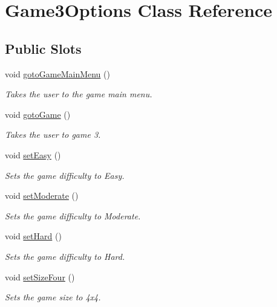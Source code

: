\hypertarget{classGame3Options}{\section{\-Game3\-Options \-Class \-Reference}
\label{classGame3Options}
}
\subsection*{\-Public \-Slots}
\begin{DoxyCompactItemize}
\item 
void \hyperlink{classGame3Options_a818c70fc684c9b850b6f7e5aa2caa8ce}{goto\-Game\-Main\-Menu} ()
\begin{DoxyCompactList}\small\item\em \-Takes the user to the game main menu. \end{DoxyCompactList}\item 
void \hyperlink{classGame3Options_a118d1afac58ddca1206ec61ea682a3ec}{goto\-Game} ()
\begin{DoxyCompactList}\small\item\em \-Takes the user to game 3. \end{DoxyCompactList}\item 
void \hyperlink{classGame3Options_a58fc11a12194fd807c6df76afd8ca0ff}{set\-Easy} ()
\begin{DoxyCompactList}\small\item\em \-Sets the game difficulty to \-Easy. \end{DoxyCompactList}\item 
void \hyperlink{classGame3Options_a9b419556514e2b5aa5a3264eff4eed23}{set\-Moderate} ()
\begin{DoxyCompactList}\small\item\em \-Sets the game difficulty to \-Moderate. \end{DoxyCompactList}\item 
void \hyperlink{classGame3Options_a0aa87fb6bd6c641e7612e864e20c4646}{set\-Hard} ()
\begin{DoxyCompactList}\small\item\em \-Sets the game difficulty to \-Hard. \end{DoxyCompactList}\item 
void \hyperlink{classGame3Options_a391983cf8d1d11ebd10eaf35ec8492f0}{set\-Size\-Four} ()
\begin{DoxyCompactList}\small\item\em \-Sets the game size to 4x4. \end{DoxyCompactList}\item 

\end{DoxyCompactItemize}

